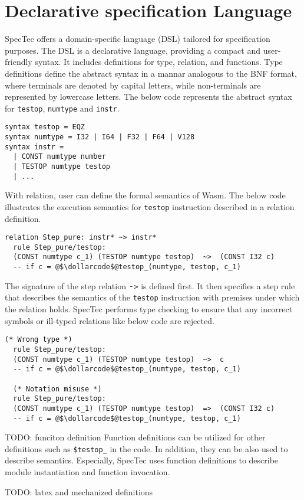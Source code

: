 
\chapter{Declarative specification Language}
\label{ch:dsl}
\noindent


SpecTec offers a domain-specific language (DSL) tailored for specification
purposes.
The DSL is a declarative language, providing a compact and user-friendly syntax.
It includes definitions for type, relation, and functions.
Type definitions define the abstract syntax in a mannar analogous to the BNF
format, where terminals are denoted by capital letters, while non-terminals are
represented by lowercase letters.
The below code represents the abstract syntax for \texttt{testop},
\texttt{numtype} and \texttt{instr}.
\begin{lstlisting}[style=dsl]
syntax testop = EQZ
syntax numtype = I32 | I64 | F32 | F64 | V128
syntax instr =
  | CONST numtype number
  | TESTOP numtype testop
  | ...
\end{lstlisting}

With relation, user can define the formal semantics of Wasm.
The below code illustrates the execution semantics for \texttt{testop}
instruction described in a relation definition.
\begin{lstlisting}[style=dsl]
  relation Step_pure: instr* ~> instr*
  rule Step_pure/testop:
  (CONST numtype c_1) (TESTOP numtype testop)  ~>  (CONST I32 c)
  -- if c = @$\dollarcode$@testop_(numtype, testop, c_1)
\end{lstlisting}
The signature of the step relation $\tildecode$\texttt{>} is defined first.
It then specifies a step rule that describes the semantics of the
\texttt{testop} instruction with premises under which the relation holds.
SpecTec performs type checking to ensure that any incorrect symbols or
ill-typed relations like below code are rejected.
\begin{lstlisting}[style=dsl]
  (* Wrong type *)
  rule Step_pure/testop:
  (CONST numtype c_1) (TESTOP numtype testop)  ~>  c
  -- if c = @$\dollarcode$@testop_(numtype, testop, c_1)

  (* Notation misuse *)
  rule Step_pure/testop:
  (CONST numtype c_1) (TESTOP numtype testop)  =>  (CONST I32 c)
  -- if c = @$\dollarcode$@testop_(numtype, testop, c_1)
\end{lstlisting}


TODO: funciton definition
Function definitions can be utilized for other definitions such as
\texttt{\$testop\_} in the code.
In addition, they can be also used to describe semantics.
Especially, SpecTec uses function definitions to describe module instantiation
and function invocation.

TODO: latex and mechanized definitions
